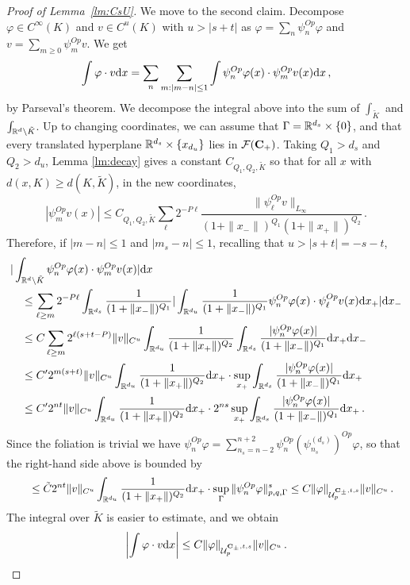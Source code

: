 \documentclass[10pt,twoside]{amsart}
\begin{document}
\begin{proof}[Proof of Lemma~\ref{lm:CsU}]
We move to the second claim.
Decompose $\varphi\in C^{\infty}(K)$ and $v\in C^u(K)$ with $u>|s+t|$ as 
$\varphi=\sum_{n} \psi_{n}^{Op}\varphi$ and 
$v=\sum_{m\ge 0} \psi_m^{Op} v$. 
We get
\[
\int \varphi\cdot v \mathrm {d} x =\sum_{n} \sum_{m:|m-n|\le 1}\int \psi_{n}^{Op}\varphi(x)  \cdot \psi_{m}^{Op}v(x) \mathrm {d} x \, , 
\]
by Parseval's theorem.
We decompose the integral above into the sum of $\int_{\tilde K}$ and $\int_{\mathbb{R}^d\setminus \tilde K}$.
Up to changing
coordinates, we can assume that $\Gamma=\mathbb{R}^{d_s} \times \{0\}$, and  that every
translated hyperplane $ \mathbb{R}^{d_s}\times \{x_{d_u}\} $ lies in $\mathcal{F}(\mathbf{C}_+)$.
Taking $Q_1>d_s$ and $Q_2>d_u$,  Lemma \ref{lm:decay} 
gives a constant $C_{Q_1,Q_2,\tilde K}$ so that for all $x$ with $d(x, K)\ge d(K,\tilde K)$,
in the new coordinates,
$$
|\psi_{m}^{Op}v(x)|
\le C_{Q_1,Q_2,\tilde K} \sum_\ell 2^{-P\ell}\frac{\|\psi_\ell^{Op}v\|_{L_\infty}}
{(1+\|x_-\|)^{Q_1}(1+\|x_+\|)^{Q_2}}  \, .
$$
Therefore, if $|m-n|\le 1$ and $|m_s-n|\le 1$,  recalling that $u>|s+t|=-s-t$,
\begin{align*}
& |\int_{\mathbb{R}^d\setminus \tilde K} \psi_{n}^{Op}\varphi(x)  \cdot \psi_{m}^{Op}v(x)| \mathrm {d} x
\\
&\quad\le 
\sum_{\ell \ge m} 2^{-P\ell}\int_{\mathbb{R}^{d_s}} \frac{1}{(1+\|x_-\|)^{Q_1}}
|\int_{\mathbb{R}^{d_u}} \frac{1}{(1+\|x_-\|)^{Q_1}}
\psi_{n}^{Op}\varphi(x) \cdot \psi_{\ell}^{Op}v(x)\mathrm {d} x_+ |\mathrm {d} x_-
\\
&\quad \le C\sum_{\ell \ge m}  2^{\ell(s+t-P)}\|v\|_{C^u} \int_{\mathbb{R}^{d_u}} \frac{1}{(1+\|x_+\|)^{Q_2}}
\int_{\mathbb{R}^{d_s}} \frac{|\psi_{n}^{Op}\varphi(x) |}{(1+\|x_-\|)^{Q_1}} \mathrm {d} x_+ \mathrm {d} x_- \\
&\quad  \le C'2^{m(s+t)}\|v\|_{C^u}
\int_{\mathbb{R}^{d_u}} \frac{1}{(1+\|x_+\|)^{Q_2}} \mathrm {d} x_+ \cdot 
\sup_{x_+} \int_{\mathbb{R}^{d_s}} \frac{|\psi_{n}^{Op}\varphi(x) |}{(1+\|x_-\|)^{Q_1}} \mathrm {d} x_+ \\
&\quad\le C'2^{nt}\|v\|_{C^u}
\int_{\mathbb{R}^{d_u}} \frac{1}{(1+\|x_+\|)^{Q_2}} \mathrm {d} x_+ \cdot 2^{ns}
\sup_{x_+} \int_{\mathbb{R}^{d_s}} \frac{|\psi_{n}^{Op}\varphi(x) |}{(1+\|x_-\|)^{Q_1}} \mathrm {d} x_+
\, .
\end{align*}
Since the foliation is trivial we have $\psi_{n}^{Op}\varphi= \sum_{n_s=n-2}^{n+2}
\psi_{n}^{Op} (\psi_{n_s}^{(d_s)})^{Op} \varphi$, so that the right-hand side above is bounded by
\begin{align*}
&\qquad  \le \tilde C 2^{nt}\|v\|_{C^u}
\int_{\mathbb{R}^{d_u}} \frac{1}{(1+\|x_+\|)^{Q_2}} \mathrm {d} x_+ \cdot 
\sup_{\Gamma} \|\psi_{n}^{Op}\varphi \|^s_{p,q,\Gamma} 
\le C \|\varphi\|_{\mathcal{U}^{\mathbf{C}_\pm,t,s}_p}
\|v\|_{C^u} 
\, .
\end{align*}
The integral over $\tilde K$ is easier to estimate, and we obtain 
\[
\left|\int \varphi\cdot v\mathrm {d} x\right|\le C \|\varphi\|_{\mathcal{U}^{\mathbf{C}_\pm,t,s}_p}
\|v\|_{C^u} \, . 
\]
\end{proof}
\end{document}
